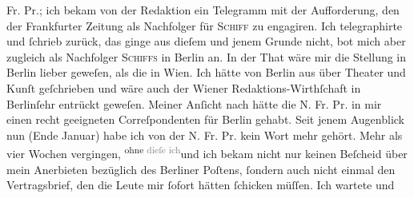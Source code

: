                   Fr. Pr.; ich bekam von der Redaktion ein Telegramm mit der Aufforderung, den \label{K_L02868-8v}\label{K_L02868-8} der Frankfurter Zeitung als Nachfolger für \textsc{Schiff} zu engagiren. {\pb}Ich telegraphirte \introOben{}und{ }ſchrieb\introOben{} zurück, das ginge aus dieſem und jenem Grunde
               nicht, bot mich aber zugleich als Nachfolger \textsc{Schiffs} in Berlin an. In der That wäre mir die Stellung in Berlin lieber geweſen,  als die in Wien. Ich hätte von
                  Berlin aus über Theater und Kunſt geſchrieben
               und wäre auch der Wiener Redaktions-Wirthſchaft in
                  Berlinſehr  entrückt geweſen. Meiner Anſicht nach hätte
               die N. Fr. Pr. in mir einen recht geeigneten
               Correſpondenten für Berlin gehabt. Seit jenem
               Augenblick nun (Ende Januar) habe ich  von der N. Fr.
                  Pr. kein Wort mehr gehört. Mehr als vier Wochen vergingen, \substVorne{}\textsuperscript{ohne{ }\textcolor{gray}{dieſe ich}}\substDazwischen{}und ich bekam\substHinten{} nicht nur keinen Beſcheid über mein Anerbieten bezüglich des Berliner Poſtens,{ }ſondern auch nicht einmal den
               Vertragsbrief, den die Leute mir{ }ſofort hätten{ }ſchicken müſſen. Ich wartete und
